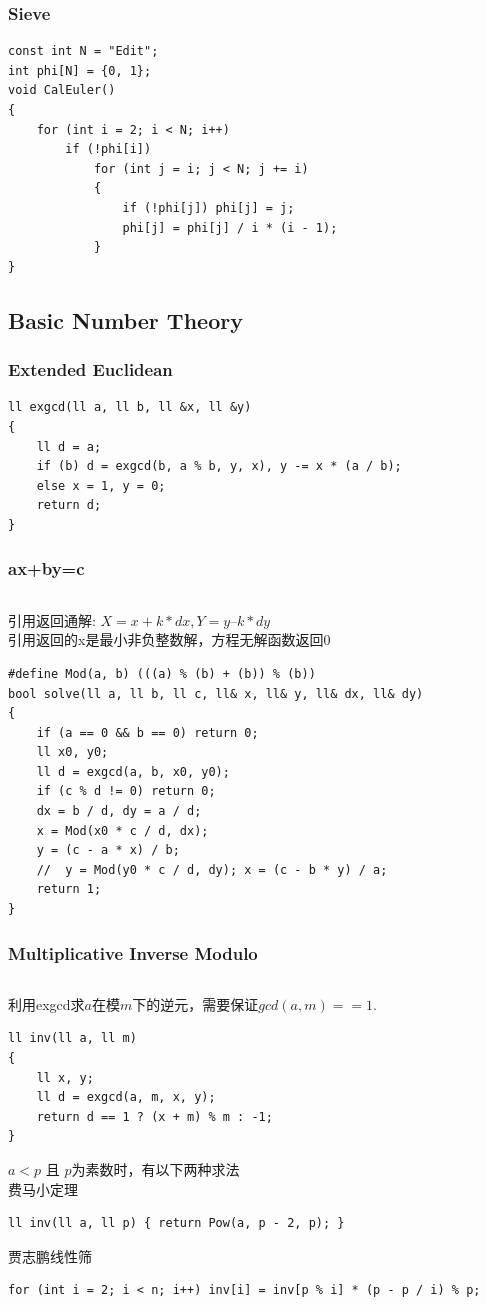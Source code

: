 \documentclass[twoside]{article}
\begin{document}
\subsubsection{Sieve}
\begin{lstlisting}
const int N = "Edit";
int phi[N] = {0, 1};
void CalEuler()
{
    for (int i = 2; i < N; i++)
        if (!phi[i])
            for (int j = i; j < N; j += i)
            {
                if (!phi[j]) phi[j] = j;
                phi[j] = phi[j] / i * (i - 1);
            }
}
\end{lstlisting}
\subsection{Basic Number Theory}
\subsubsection{Extended Euclidean}
\begin{lstlisting}
ll exgcd(ll a, ll b, ll &x, ll &y)
{
    ll d = a;
    if (b) d = exgcd(b, a % b, y, x), y -= x * (a / b);
    else x = 1, y = 0;
    return d;
}
\end{lstlisting}
\subsubsection{ax+by=c}
\begin{lstlisting}
\end{lstlisting}
引用返回通解: $X = x + k * dx, Y = y – k * dy$\\
引用返回的x是最小非负整数解，方程无解函数返回0
\begin{lstlisting}
#define Mod(a, b) (((a) % (b) + (b)) % (b))
bool solve(ll a, ll b, ll c, ll& x, ll& y, ll& dx, ll& dy)
{
    if (a == 0 && b == 0) return 0;
    ll x0, y0;
    ll d = exgcd(a, b, x0, y0);
    if (c % d != 0) return 0;
    dx = b / d, dy = a / d;
    x = Mod(x0 * c / d, dx);
    y = (c - a * x) / b;
    //  y = Mod(y0 * c / d, dy); x = (c - b * y) / a;
    return 1;
}
\end{lstlisting}
\subsubsection{Multiplicative Inverse Modulo}
\begin{lstlisting}
\end{lstlisting}
利用exgcd求$a$在模$m$下的逆元，需要保证$gcd(a, m) == 1$.
\begin{lstlisting}
ll inv(ll a, ll m)
{
    ll x, y;
    ll d = exgcd(a, m, x, y);
    return d == 1 ? (x + m) % m : -1;
}
\end{lstlisting}
$a < p$ 且 $p$为素数时，有以下两种求法\\
费马小定理
\begin{lstlisting}
ll inv(ll a, ll p) { return Pow(a, p - 2, p); }
\end{lstlisting}
贾志鹏线性筛
\begin{lstlisting}
for (int i = 2; i < n; i++) inv[i] = inv[p % i] * (p - p / i) % p;
\end{lstlisting}
\end{document}

